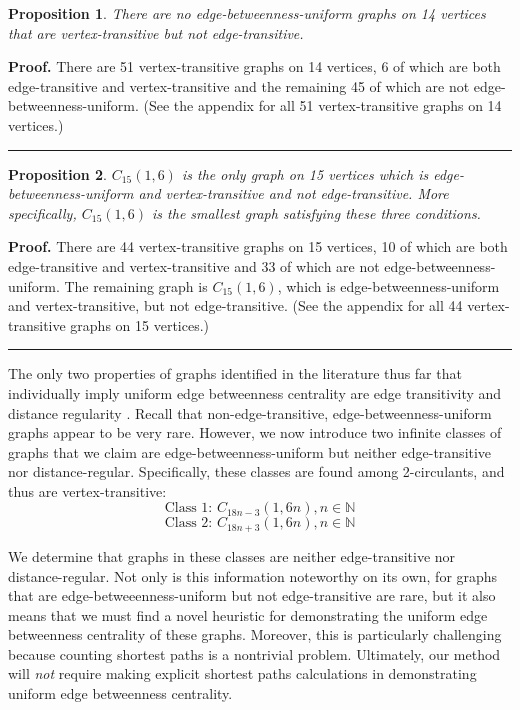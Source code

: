 \documentclass{article}%
\newtheorem{proposition}{Proposition}[section]
\newenvironment{proof}[1][Proof]{\textbf{#1.} }{\ \rule{0.5em}{0.5em}}
\begin{document}
\begin{proposition}
There are no edge-betweenness-uniform graphs on 14 vertices that are
vertex-transitive but not edge-transitive.
\end{proposition}

\begin{proof}
There are 51 vertex-transitive graphs on 14 vertices, 6 of which are both
edge-transitive and vertex-transitive and the remaining 45 of which are not
edge-betweenness-uniform. (See the appendix for all 51 vertex-transitive
graphs on 14 vertices.)
\end{proof}

\begin{proposition}
$C_{15}(1,6)$ is the only graph on 15 vertices which is
edge-betweenness-uniform and vertex-transitive and not edge-transitive. More
specifically, $C_{15}(1,6)$ is the smallest graph satisfying these three conditions.
\end{proposition}

\begin{proof}
There are 44 vertex-transitive graphs on 15 vertices, 10 of which are both
edge-transitive and vertex-transitive and 33 of which are not
edge-betweenness-uniform. The remaining graph is $C_{15}(1,6)$, which is
edge-betweenness-uniform and vertex-transitive, but not edge-transitive. (See
the appendix for all 44 vertex-transitive graphs on 15 vertices.)
\end{proof}

\noindent\newline\indent The only two properties of graphs identified in the
literature thus far that individually imply uniform edge betweenness
centrality are edge transitivity and distance regularity \cite{GagoS2}. Recall
that non-edge-transitive, edge-betweenness-uniform graphs appear to be very
rare. However, we now introduce two infinite classes of graphs that we claim
are edge-betweenness-uniform but neither edge-transitive nor distance-regular.
Specifically, these classes are found among 2-circulants, and thus are
vertex-transitive:
\[
\mbox{Class 1: }C_{18n-3}(1,6n),\mbox{}n\in\mathbb{N}%
\]%
\[
\mbox{Class 2: }C_{18n+3}(1,6n),\mbox{}n\in\mathbb{N}%
\]


\indent We determine that graphs in these classes are neither edge-transitive
nor distance-regular. Not only is this information noteworthy on its own, for
graphs that are edge-betweeenness-uniform but not edge-transitive are rare,
but it also means that we must find a novel heuristic for demonstrating the
uniform edge betweenness centrality of these graphs. Moreover, this is
particularly challenging because counting shortest paths is a nontrivial
problem. Ultimately, our method will \textit{not} require making explicit
shortest paths calculations in demonstrating uniform edge betweenness centrality.
\end{document}
